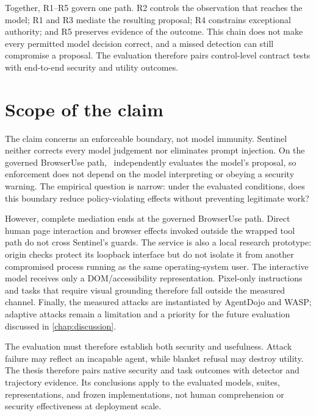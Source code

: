 Together, R1--R5 govern one path. R2 controls the observation that reaches the
model; R1 and R3 mediate the resulting proposal; R4 constrains exceptional
authority; and R5 preserves evidence of the outcome. This chain does not make
every permitted model decision correct, and a missed detection can still
compromise a proposal. The evaluation therefore pairs control-level contract
tests with end-to-end security and utility outcomes.

\section{Scope of the claim}

The claim concerns an enforceable boundary, not model immunity. Sentinel
neither corrects every model judgement nor eliminates prompt injection. On the
governed BrowserUse path, \systemname\ independently evaluates the model's
proposal, so enforcement does not depend on the model interpreting or obeying a
security warning. The empirical question is narrow: under the evaluated
conditions, does this boundary reduce policy-violating effects without
preventing legitimate work?

However, complete mediation ends at the governed BrowserUse path. Direct human
page interaction and browser effects invoked outside the wrapped tool path do
not cross Sentinel's guards. The service is also a local research prototype:
origin checks protect its loopback interface but do not isolate it from another
compromised process running as the same operating-system user. The interactive
model receives only a DOM/accessibility representation. Pixel-only instructions
and tasks that require visual grounding therefore fall outside the measured
channel. Finally, the measured attacks are instantiated by AgentDojo and WASP;
adaptive attacks remain a limitation and a priority for the future evaluation
discussed in \cref{chap:discussion}.

The evaluation must therefore establish both security and usefulness. Attack
failure may reflect an incapable agent, while blanket refusal may destroy
utility. The thesis therefore pairs native security and task outcomes with
detector and trajectory evidence. Its conclusions apply
to the evaluated models, suites, representations, and frozen implementations,
not human comprehension or security effectiveness at deployment scale.
